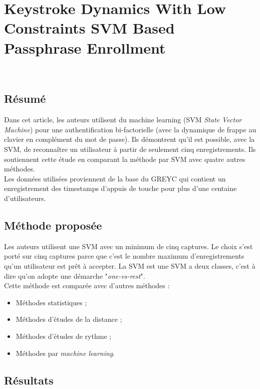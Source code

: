 \section{Keystroke Dynamics With Low Constraints SVM Based Passphrase Enrollment\cite{giotSVM}}

\\

\subsection{Résumé}

Dans cet article, les auteurs utilisent du machine learning (SVM \textit{State Vector Machine}) pour une authentification bi-factorielle (avec la dynamique de frappe au clavier en complément du mot de passe). Ils démontrent qu'il est possible, avec la SVM, de reconnaître un utilisateur à partir de seulement cinq enregistrements. Ils soutiennent cette étude en comparant la méthode par SVM avec quatre autres méthodes.\\

Les données utilisées proviennent de la base du GREYC qui contient un enregistrement des timestamps d'appuis de touche pour plus d'une centaine d'utilisateurs.

\subsection{Méthode proposée}

Les auteurs utilisent une SVM avec un minimum de cinq captures. Le choix s'est porté sur cinq captures parce que c'est le nombre maximum d'enregistrements qu'un utilisateur est prêt à accepter. La SVM est une SVM a deux classes, c'est à dire qu'on adopte une démarche "\textit{one-vs-rest}".\\

Cette méthode est comparée avec d'autres méthodes :

\begin{itemize}
  \item Méthodes statistiques ;
  \item Méthodes d'études de la distance ;
  \item Méthodes d'études de rythme ;
  \item Méthodes par \textit{machine learning}.
\end{itemize}

\subsection{Résultats}

